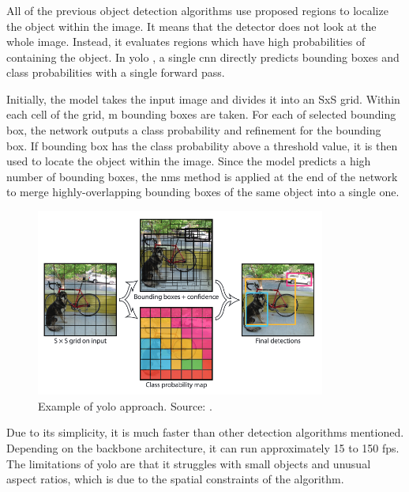         \subsubsection{}
            All of the previous object detection algorithms use proposed regions to localize the object within the image. It means that the detector does not look at the whole image. Instead, it evaluates regions which have high probabilities of containing the object. In \gls{yolo} \cite{redmon2016you}, a single \gls{cnn} directly predicts bounding boxes and class probabilities with a single forward pass.
            
            Initially, the model takes the input image and divides it into an SxS grid. Within each cell of the grid, m bounding boxes are taken. For each of selected bounding box, the network outputs a class probability and refinement for the bounding box. If bounding box has the class probability above a threshold value, it is then used to locate the object within the image. Since the model predicts a high number of bounding boxes, the \gls{nms} method is applied at the end of the network to merge highly-overlapping bounding boxes of the same object into a single one.
            
             \begin{figure}[ht]
                \centering
                \includegraphics[width=0.85\textwidth]{resources/yolo_approach.png}
                \caption{Example of \gls{yolo} approach. Source: \cite{redmon2016you}.}
                \label{fig:yolo approach}
            \end{figure}
            
            Due to its simplicity, it is much faster than other detection algorithms mentioned. Depending on the backbone architecture, it can run approximately 15 to 150 \gls{fps}. The limitations of \gls{yolo} are that it struggles with small objects and unusual aspect ratios, which is due to the spatial constraints of the algorithm.

